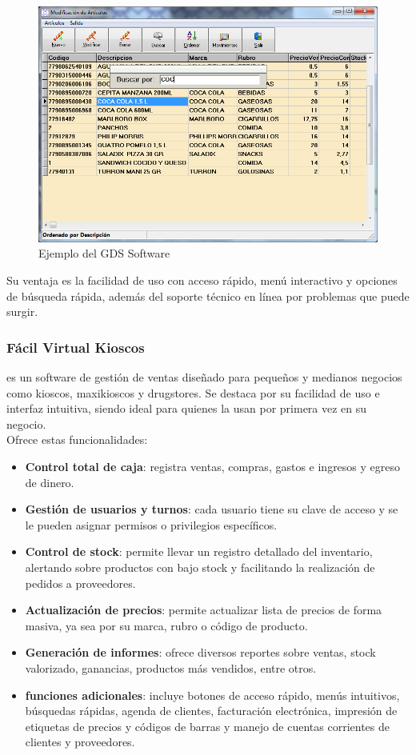 \documentclass[twoside]{article}
\begin{document}
\begin{figure}[!h]
    \centering
    \includegraphics[scale=0.4]{gds.png}
    \caption{Ejemplo del GDS Software}
    \label{fig:enter-label}
\end{figure}

Su ventaja es la facilidad de uso con acceso rápido, menú interactivo y opciones de búsqueda rápida, además del soporte técnico en línea por problemas que puede surgir. \\

\subsubsection{Fácil Virtual Kioscos}
es un software de gestión de ventas diseñado para pequeños y medianos negocios como kioscos, maxikioscos y drugstores. Se destaca por su facilidad de uso e interfaz intuitiva, siendo ideal para quienes la usan por primera vez en su negocio. \\
Ofrece estas funcionalidades:\cite{facilvirtualSoftwarePara}
\begin{itemize}
	\item \textbf{Control total de caja}: registra ventas, compras, gastos e ingresos y egreso de dinero.
	\item \textbf{Gestión de usuarios y turnos}: cada usuario tiene su clave de acceso y se le pueden asignar permisos o privilegios específicos.
	\item \textbf{Control de stock}: permite llevar un registro detallado del inventario, alertando sobre productos con bajo stock y facilitando la realización de pedidos a proveedores.
	\item \textbf{Actualización de precios}: permite actualizar lista de precios de forma masiva, ya sea por su marca, rubro o código de producto.
	\item \textbf{Generación de informes}: ofrece diversos reportes sobre ventas, stock valorizado, ganancias, productos más vendidos, entre otros.
	\item \textbf{funciones adicionales}: incluye botones de acceso rápido, menús intuitivos, búsquedas rápidas, agenda de clientes, facturación electrónica, impresión de etiquetas de precios y códigos de barras y manejo de cuentas corrientes de clientes y proveedores.
\end{itemize}
\end{document}
